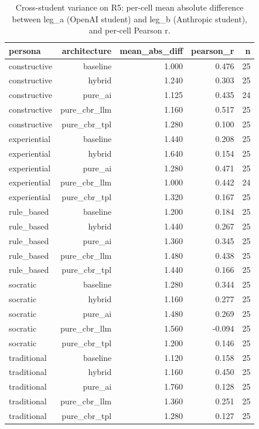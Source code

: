 \begin{table}[htbp]
\centering
\caption{Cross-student variance on R5: per-cell mean absolute difference between leg\_a (OpenAI student) and leg\_b (Anthropic student), and per-cell Pearson r.}
\label{tab:cross-student}
\begin{tabular}{lrrrr}
\toprule
persona & architecture & mean\_abs\_diff & pearson\_r & n \\
\midrule
constructive & baseline & 1.000 & 0.476 & 25 \\
constructive & hybrid & 1.240 & 0.303 & 25 \\
constructive & pure\_ai & 1.125 & 0.435 & 24 \\
constructive & pure\_cbr\_llm & 1.160 & 0.517 & 25 \\
constructive & pure\_cbr\_tpl & 1.280 & 0.100 & 25 \\
experiential & baseline & 1.440 & 0.208 & 25 \\
experiential & hybrid & 1.640 & 0.154 & 25 \\
experiential & pure\_ai & 1.280 & 0.471 & 25 \\
experiential & pure\_cbr\_llm & 1.000 & 0.442 & 24 \\
experiential & pure\_cbr\_tpl & 1.320 & 0.167 & 25 \\
rule\_based & baseline & 1.200 & 0.184 & 25 \\
rule\_based & hybrid & 1.440 & 0.267 & 25 \\
rule\_based & pure\_ai & 1.360 & 0.345 & 25 \\
rule\_based & pure\_cbr\_llm & 1.480 & 0.438 & 25 \\
rule\_based & pure\_cbr\_tpl & 1.440 & 0.166 & 25 \\
socratic & baseline & 1.280 & 0.344 & 25 \\
socratic & hybrid & 1.160 & 0.277 & 25 \\
socratic & pure\_ai & 1.480 & 0.269 & 25 \\
socratic & pure\_cbr\_llm & 1.560 & -0.094 & 25 \\
socratic & pure\_cbr\_tpl & 1.200 & 0.146 & 25 \\
traditional & baseline & 1.120 & 0.158 & 25 \\
traditional & hybrid & 1.160 & 0.450 & 25 \\
traditional & pure\_ai & 1.760 & 0.128 & 25 \\
traditional & pure\_cbr\_llm & 1.360 & 0.251 & 25 \\
traditional & pure\_cbr\_tpl & 1.280 & 0.127 & 25 \\
\bottomrule
\end{tabular}
\end{table}
